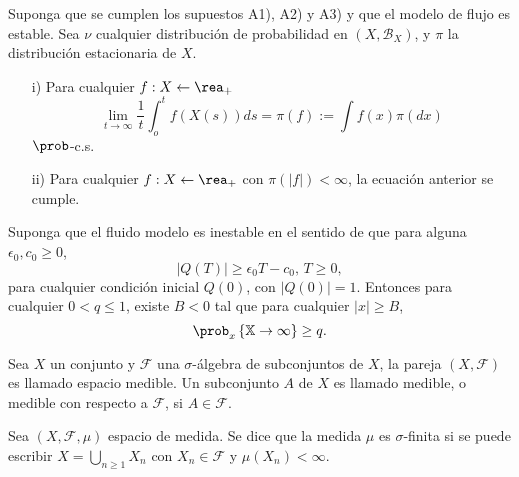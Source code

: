 \begin{Teo}\label{Tma.6.4.DaiSean}
Suponga que se cumplen los supuestos A1), A2) y A3) y que el
modelo de flujo es estable. Sea $\nu$ cualquier distribuci\'on de
probabilidad en $\left(X,\mathcal{B}_{X}\right)$, y $\pi$ la
distribuci\'on estacionaria de $X$.
\begin{itemize}
\item[i)] Para cualquier $f:X\leftarrow\rea_{+}$
\begin{equation}
\lim_{t\rightarrow\infty}\frac{1}{t}\int_{o}^{t}f\left(X\left(s\right)\right)ds=\pi\left(f\right):=\int
f\left(x\right)\pi\left(dx\right)
\end{equation}
$\prob$-c.s.

\item[ii)] Para cualquier $f:X\leftarrow\rea_{+}$ con
$\pi\left(|f|\right)<\infty$, la ecuaci\'on anterior se cumple.
\end{itemize}
\end{Teo}

\begin{Teo}\label{Tma2.2.Down}
Suponga que el fluido modelo es inestable en el sentido de que
para alguna $\epsilon_{0},c_{0}\geq0$,
\begin{equation}\label{Eq.Inestability}
|Q\left(T\right)|\geq\epsilon_{0}T-c_{0}\textrm{,   }T\geq0,
\end{equation}
para cualquier condici\'on inicial $Q\left(0\right)$, con
$|Q\left(0\right)|=1$. Entonces para cualquier $0<q\leq1$, existe
$B<0$ tal que para cualquier $|x|\geq B$,
\begin{equation}
\prob_{x}\left\{\mathbb{X}\rightarrow\infty\right\}\geq q.
\end{equation}
\end{Teo}



\begin{Def}
Sea $X$ un conjunto y $\mathcal{F}$ una $\sigma$-\'algebra de
subconjuntos de $X$, la pareja $\left(X,\mathcal{F}\right)$ es
llamado espacio medible. Un subconjunto $A$ de $X$ es llamado
medible, o medible con respecto a $\mathcal{F}$, si
$A\in\mathcal{F}$.
\end{Def}

\begin{Def}
Sea $\left(X,\mathcal{F},\mu\right)$ espacio de medida. Se dice
que la medida $\mu$ es $\sigma$-finita si se puede escribir
$X=\bigcup_{n\geq1}X_{n}$ con $X_{n}\in\mathcal{F}$ y
$\mu\left(X_{n}\right)<\infty$.
\end{Def}


